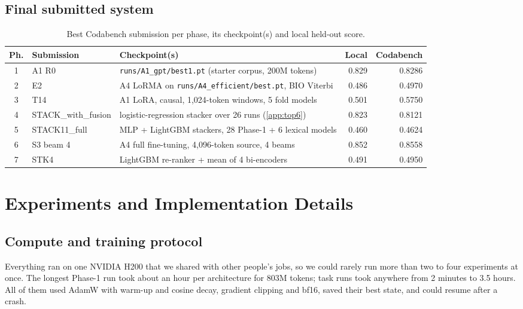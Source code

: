 \documentclass[11pt, oneside]{article}
\newcommand{\code}[1]{\texttt{\small #1}}
\begin{document}
\subsection{Final submitted system}
\begin{table}[!t]\centering\footnotesize
\caption{Best Codabench submission per phase, its checkpoint(s) and local held-out score.}\label{tab:final}
\begin{tabularx}{\linewidth}{clXrr}\toprule
Ph. & Submission & Checkpoint(s) & Local & Codabench\\\midrule
1 & A1 R0 & \code{runs/A1\_gpt/best1.pt} (starter corpus, 200M tokens) & 0.829 & 0.8286\\
2 & E2 & A4 LoRMA on \code{runs/A4\_efficient/best.pt}, BIO Viterbi & 0.486 & 0.4970\\
3 & T14 & A1 LoRA, causal, 1,024-token windows, 5 fold models & 0.501 & 0.5750\\
4 & STACK\_with\_fusion & logistic-regression stacker over 26 runs (\autoref{app:top6}) & 0.823 & 0.8121\\
5 & STACK11\_full & MLP + LightGBM stackers, 28 Phase-1 + 6 lexical models & 0.460 & 0.4624\\
6 & S3 beam 4 & A4 full fine-tuning, 4,096-token source, 4 beams & 0.852 & 0.8558\\
7 & STK4 & LightGBM re-ranker + mean of 4 bi-encoders & 0.491 & 0.4950\\
\bottomrule\end{tabularx}\end{table}

\section{Experiments and Implementation Details}
\subsection{Compute and training protocol}
Everything ran on one NVIDIA H200 that we shared with other people's jobs, so we could rarely run more than
two to four experiments at once.  The longest Phase-1 run took about an hour per architecture for 803M tokens;
task runs took anywhere from 2 minutes to 3.5 hours.  All of them used AdamW with warm-up and cosine decay,
gradient clipping and bf16, saved their best state, and could resume after a crash.
\end{document}
